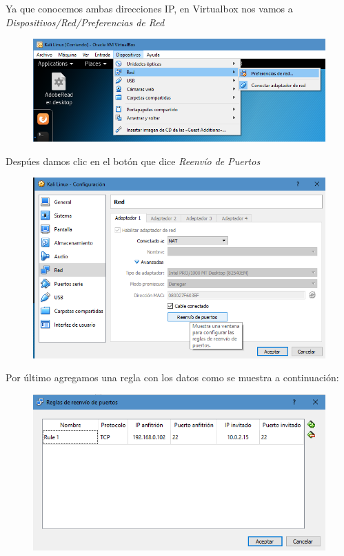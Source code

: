 \documentclass{article}
\begin{document}
Ya que conocemos ambas direcciones IP, en Virtualbox nos vamos a \emph{Dispositivos/Red/Preferencias de Red}

\begin{figure}[H]
\centering
\includegraphics[width=1\textwidth]{03-PREFERENCIADERED}
\end{figure}

Desp\'ues damos clic en el bot\'on que dice \emph{Reenv\'io de Puertos}

\begin{figure}[H]
\centering
\includegraphics[width=1\textwidth]{04-REENVIOPUERTOS}
\end{figure}

Por \'ultimo agregamos una regla con los datos como se muestra a continuaci\'on: 

\begin{figure}[H]
\centering
\includegraphics[width=1\textwidth]{05-CONFIGURADO}
\end{figure}
\end{document}
